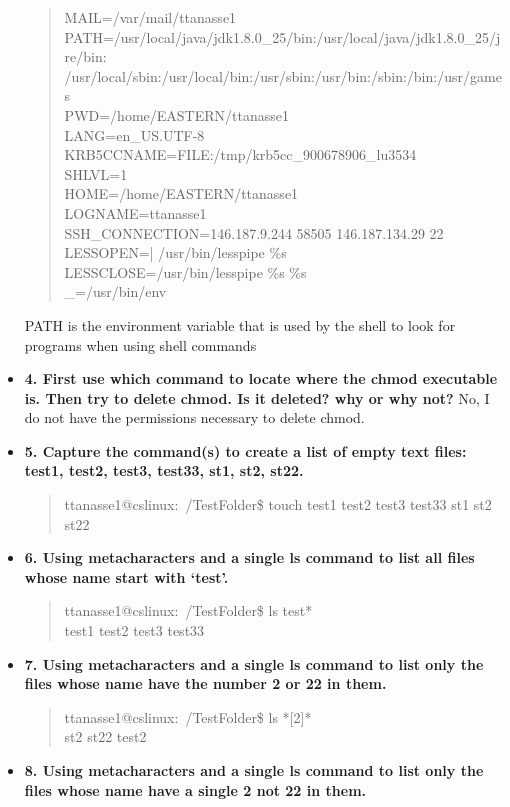 \documentclass{article}
\begin{document}
\begin{itemize}
\begin{quote}
MAIL=/var/mail/ttanasse1\\
PATH=/usr/local/java/jdk1.8.0\_25/bin:/usr/local/java/jdk1.8.0\_25/jre/bin:\\/usr/local/sbin:/usr/local/bin:/usr/sbin:/usr/bin:/sbin:/bin:/usr/games\\
PWD=/home/EASTERN/ttanasse1\\
LANG=en\_US.UTF-8\\
KRB5CCNAME=FILE:/tmp/krb5cc\_900678906\_lu3534\\
SHLVL=1\\
HOME=/home/EASTERN/ttanasse1\\
LOGNAME=ttanasse1\\
SSH\_CONNECTION=146.187.9.244 58505 146.187.134.29 22\\
LESSOPEN=| /usr/bin/lesspipe \%s\\
LESSCLOSE=/usr/bin/lesspipe \%s \%s\\
\_=/usr/bin/env
  \end{quote}
  PATH is the environment variable that is used by the shell to look for programs when using shell commands
  \item \textbf{4. First use which command to locate where the chmod executable is. Then try to delete chmod.  Is it deleted? why or why not?}
  No, I do not have the permissions necessary to delete chmod.
\item\textbf{5. Capture the command(s) to create a list of empty text files:  test1, test2, test3, test33, st1, st2, st22.}
\begin{quote}
  ttanasse1@cslinux:~/TestFolder\$ touch test1 test2 test3 test33 st1 st2 st22
\end{quote}
\item \textbf{6. Using metacharacters and a single ls command to list all files whose name start with ‘test’.}
\begin{quote}
  ttanasse1@cslinux:~/TestFolder\$ ls test*\\
test1  test2  test3  test33
\end{quote}
\item \textbf{7. Using metacharacters and a single ls command to list only the files whose name have the number 2 or 22 in them.}
\begin{quote}
  ttanasse1@cslinux:~/TestFolder\$ ls *[2]*\\
st2  st22  test2
\end{quote}
\item \textbf{8. Using metacharacters and a single ls command to list only the files whose name have a single 2 not 22 in them.}

\end{itemize}
\end{document}
